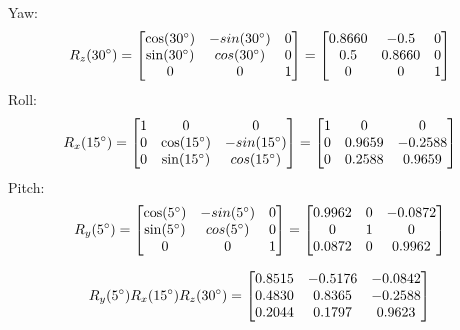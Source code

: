 \documentclass[english]{article}
\begin{document}
Yaw:
\[ R_z(30\degree) = \begin{bmatrix}
	\cos(30\degree) & -sin(30\degree) & 0 \\
	\sin(30\degree) & cos(30\degree) & 0 \\
	    0      &      0     & 1 \\
\end{bmatrix} = \begin{bmatrix}
	0.8660 & -0.5   & 0 \\
	0.5    & 0.8660 & 0 \\
       0   &    0   & 1 \\
\end{bmatrix} \]
Roll:
\[ R_x(15\degree) = \begin{bmatrix}
	1 &         0       &       0        \\
	0 & \cos(15\degree) & -sin(15\degree) \\
	0 & \sin(15\degree) & cos(15\degree) \\
\end{bmatrix} = \begin{bmatrix}
        1   &    0   &    0    \\
        0   & 0.9659 & -0.2588 \\
        0   & 0.2588 &  0.9659 \\
\end{bmatrix} \]
Pitch:
\[ R_y(5\degree) = \begin{bmatrix}
	\cos(5\degree) & -sin(5\degree) & 0 \\
	\sin(5\degree) &  cos(5\degree) & 0 \\
	    0      &      0     & 1 \\
\end{bmatrix} = \begin{bmatrix}
	0.9962 & 0 & -0.0872 \\
	   0   & 1 &     0   \\
	0.0872 & 0 &  0.9962 \\
\end{bmatrix} \]

\[ R_y(5\degree) R_x(15\degree) R_z(30\degree) = \begin{bmatrix}
    0.8515  &  -0.5176  &  -0.0842 \\
    0.4830  &   0.8365  &  -0.2588 \\
    0.2044  &   0.1797  &   0.9623 \\
\end{bmatrix} \]
\end{document}
